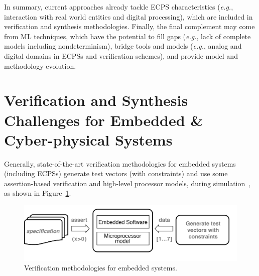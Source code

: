 \documentclass[format=acmsmall, review=false, screen=true]{acmart}
\begin{document}
In summary, current approaches already tackle ECPS characteristics ({\it e.g.}, interaction with real world entities and digital processing), which are included in verification and synthesis methodologies. Finally, the final complement may come from ML techniques, which have the potential to fill gaps ({\it e.g.}, lack of complete models including nondeterminism), bridge tools and models ({\it e.g.}, analog and digital domains in ECPSs and verification schemes), and provide model and methodology evolution.  


\section{Verification and Synthesis \\ Challenges for Embedded \& Cyber-physical Systems}
\label{Verification-Challenges} 

Generally, state-of-the-art verification methodologies for embedded systems (including ECPSs) generate test vectors (with constraints) and use some assertion-based verification and high-level processor models, during simulation~\cite{Behrend15,Lettnin09}, as shown in Figure~\ref{verification-methodologies}. 
%
\begin{figure}[h]
	\centering
	\includegraphics[width=\textwidth]{figure4.jpg}
	\caption{Verification methodologies for embedded systems.}
	\label{verification-methodologies}
\end{figure}
\end{document}
